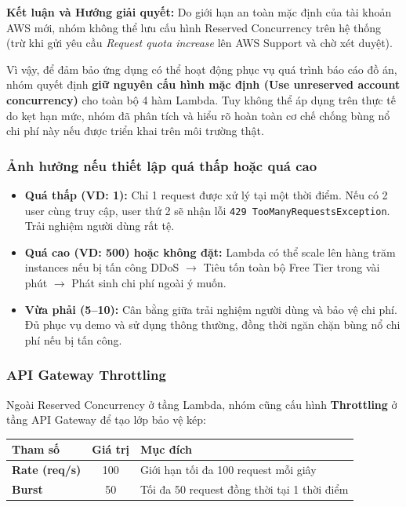 \documentclass[13pt]{article}
\begin{document}
\textbf{Kết luận và Hướng giải quyết:} 
Do giới hạn an toàn mặc định của tài khoản AWS mới, nhóm không thể lưu cấu hình Reserved Concurrency trên hệ thống (trừ khi gửi yêu cầu \textit{Request quota increase} lên AWS Support và chờ xét duyệt). 

Vì vậy, để đảm bảo ứng dụng có thể hoạt động phục vụ quá trình báo cáo đồ án, nhóm quyết định \textbf{giữ nguyên cấu hình mặc định (Use unreserved account concurrency)} cho toàn bộ 4 hàm Lambda. Tuy không thể áp dụng trên thực tế do kẹt hạn mức, nhóm đã phân tích và hiểu rõ hoàn toàn cơ chế chống bùng nổ chi phí này nếu được triển khai trên môi trường thật.

\subsubsection{Ảnh hưởng nếu thiết lập quá thấp hoặc quá cao}
\begin{itemize}
    \item \textbf{Quá thấp (VD: 1):} Chỉ 1 request được xử lý tại một thời điểm. Nếu có 2 user cùng truy cập, user thứ 2 sẽ nhận lỗi \texttt{429 TooManyRequestsException}. Trải nghiệm người dùng rất tệ.
    \item \textbf{Quá cao (VD: 500) hoặc không đặt:} Lambda có thể scale lên hàng trăm instances nếu bị tấn công DDoS $\rightarrow$ Tiêu tốn toàn bộ Free Tier trong vài phút $\rightarrow$ Phát sinh chi phí ngoài ý muốn.
    \item \textbf{Vừa phải (5--10):} Cân bằng giữa trải nghiệm người dùng và bảo vệ chi phí. Đủ phục vụ demo và sử dụng thông thường, đồng thời ngăn chặn bùng nổ chi phí nếu bị tấn công.
\end{itemize}

\subsubsection{API Gateway Throttling}
Ngoài Reserved Concurrency ở tầng Lambda, nhóm cũng cấu hình \textbf{Throttling} ở tầng API Gateway để tạo lớp bảo vệ kép:

\begin{longtable}{|p{}|c|p{}|}
\hline
\textbf{Tham số} & \textbf{Giá trị} & \textbf{Mục đích} \\ \hline
\endhead
\textbf{Rate (req/s)} & 100 & Giới hạn tối đa 100 request mỗi giây \\ \hline
\textbf{Burst} & 50 & Tối đa 50 request đồng thời tại 1 thời điểm \\ \hline
\end{longtable}
\end{document}
